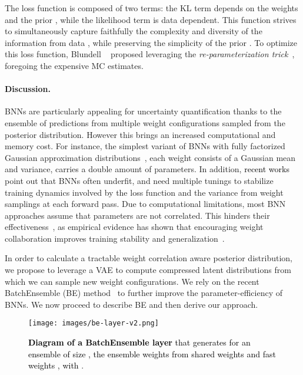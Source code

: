 \documentclass[10pt,twocolumn,letterpaper]{article}
\newcommand{\ab}[1]{\textcolor{black}{#1}}
\begin{document}
The loss function  is composed of two terms: the KL term depends on the weights and the prior , while the likelihood term is data dependent. This function strives to simultaneously capture faithfully the complexity and diversity of the information from data , while 
preserving the simplicity of the prior . To optimize this loss function, Blundell \etal~\cite{blundell2015weight} proposed leveraging the \emph{re-parameterization trick}~\cite{kingma13vae,rezende2014stochastic}, foregoing the expensive MC estimates.

\paragraph{Discussion.} BNNs are particularly appealing for uncertainty quantification thanks to the ensemble of predictions from multiple weight configurations sampled from the posterior distribution. However this brings an increased computational and memory cost. For instance, the simplest variant of BNNs with fully factorized Gaussian approximation distributions~\cite{blundell2015weight,graves2011practical}, 
{\ie each weight consists of a Gaussian mean and variance, carries a double amount of parameters.} In addition, 
\ab{recent works~\cite{ ovadia2019can, dusenberry2020efficient}} point out that BNNs often underfit, and need multiple tunings to stabilize training dynamics involved by the loss function and the variance from weight samplings at each forward pass. 
Due to computational limitations, most BNN approaches assume that parameters are not correlated. This hinders their effectiveness~\cite{foong2020expressiveness}, as empirical evidence has shown that encouraging weight collaboration improves training stability and generalization~\cite{qiao2019weight, salimans2016weight,srivastava2014dropout}. 

In order to calculate a tractable weight correlation aware posterior distribution, we propose to leverage a VAE to compute compressed latent distributions {from which we can sample new weight configurations.}
We rely on the recent BatchEnsemble (BE) method~\cite{wen2020batchensemble} to further improve the parameter-efficiency of BNNs. We now proceed to describe BE and then derive our approach.












\begin{figure}[!t]
\renewcommand{\captionfont}{\small}
\centering
\texttt{[image: images/be-layer-v2.png]}
\caption{\ab{\textbf{Diagram of a BatchEnsemble layer} that generates for an ensemble of size , the ensemble weights  from shared weights  and fast weights , with }.}
\label{fig:be-layer}
\end{figure}
\end{document}

